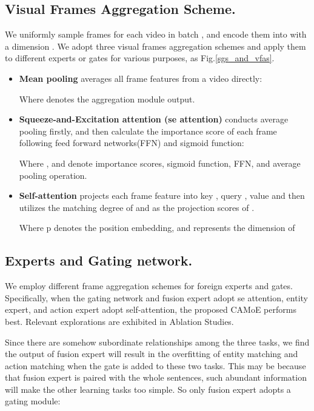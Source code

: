 \documentclass[letterpaper]{article} \usepackage{aaai22}  \usepackage{times}  \usepackage{helvet}  \usepackage{courier}  \usepackage[hyphens]{url}  \usepackage{graphicx} \urlstyle{rm} \def\UrlFont{\rm}  \usepackage{natbib}  \usepackage{caption}
\begin{document}
\subsection{Visual Frames Aggregation Scheme.}
We uniformly sample  frames for each video in batch , and encode them into  with a dimension . We adopt three visual frames aggregation schemes and apply them to different experts or gates for various purposes, as Fig.\ref{sgs_and_vfas}. 
\begin{itemize}
    \item \textbf{Mean pooling} averages all frame features from a video directly:
        
        Where  denotes the aggregation module output.
    \item \textbf{Squeeze-and-Excitation attention (se attention)}\cite{hu2018senet} conducts average pooling firstly, and then calculate the importance score of each frame following feed forward networks(FFN) and sigmoid function:
        
        Where , and  denote importance scores, sigmoid function, FFN, and average pooling operation.
    \item \textbf{Self-attention} \cite{vaswani2017attention} projects each frame feature into key , query , value  and then utilizes the matching degree of  and  as the projection scores of .
        
    Where p denotes the position embedding, and  represents the dimension of 
\end{itemize}



\subsection{Experts and Gating network.}
We employ different frame aggregation schemes for foreign experts and gates. Specifically, when the gating network and fusion expert adopt se attention, entity expert, and action expert adopt self-attention, the proposed CAMoE performs best.
Relevant explorations are exhibited in Ablation Studies.

Since there are somehow subordinate relationships among the three tasks, we find the output of fusion expert  will result in the overfitting of entity matching and action matching when the gate is added to these two tasks. This may be because that fusion expert is paired with the whole sentences, such abundant information will make the other learning tasks too simple. So only fusion expert adopts a gating module:
\end{document}
